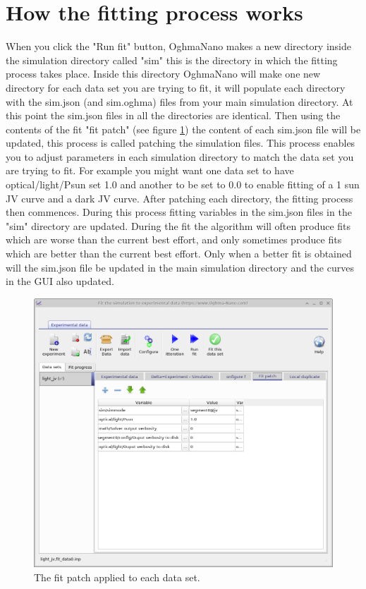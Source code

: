 \section{How the fitting process works}
When you click the "Run fit" button, OghmaNano makes a new directory inside the simulation directory called "sim" this is the directory in which the fitting process takes place. Inside this directory OghmaNano will make one new directory for each data set you are trying to fit, it will populate each directory with the sim.json (and sim.oghma) files from your main simulation directory.  At this point the sim.json files in all the directories are identical.  Then using the contents of the fit "fit patch" (see figure \ref{fig:fit_patch}) the content of each sim.json file will be updated, this process is called patching the simulation files.  This process enables you to adjust parameters in each simulation directory to match the data set you are trying to fit. For example you might want one data set to have optical/light/Psun set 1.0 and another to be set to 0.0 to enable fitting of a 1 sun JV curve and a dark JV curve. After patching each directory, the fitting process then commences. During this process fitting variables in the sim.json files in the "sim" directory are updated.  During the fit the algorithm will often produce fits which are worse than the current best effort, and only sometimes produce fits which are better than the current best effort. Only when a better fit is obtained will the sim.json file be updated in the main simulation directory and the curves in the GUI also updated.

\begin{figure}[H]
\centering
\includegraphics[width=\textwidth]{./images/fit/fit_patch.png}
\caption{The fit patch applied to each data set.}
\label{fig:fit_patch}
\end{figure}



